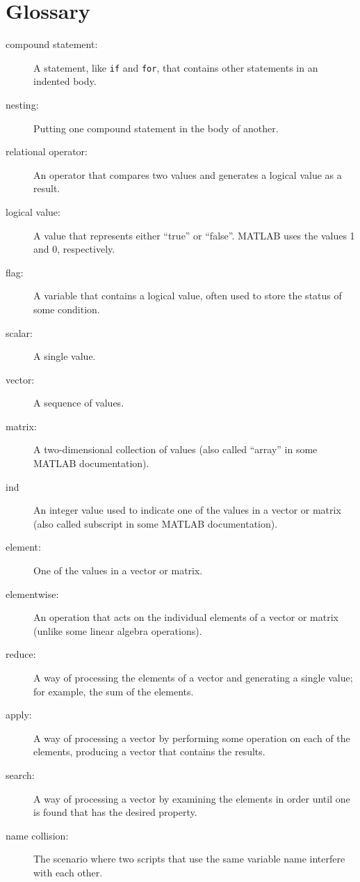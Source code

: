 \section{Glossary}

\begin{description}

\item[compound statement:] A statement, like {\tt if} and {\tt for}, that
contains other statements in an indented body.

\item[nesting:] Putting one compound statement in the body of another.

\item[relational operator:] An operator that compares two values and
generates a logical value as a result.

\item[logical value:] A value that represents either ``true'' or
``false''.  MATLAB uses the values 1 and 0, respectively.

\item[flag:] A variable that contains a logical value, often used
to store the status of some condition.

\item[scalar:] A single value.

\item[vector:] A sequence of values.

\item[matrix:] A two-dimensional collection of values (also called
``array'' in some MATLAB documentation).

\item[ind] An integer value used to indicate one of the values
in a vector or matrix (also called subscript in some MATLAB documentation).

\item[element:] One of the values in a vector or matrix.

\item[elementwise:] An operation that acts on the individual elements
of a vector or matrix (unlike some linear algebra operations).

\item[reduce:] A way of processing the elements of a vector and
generating a single value; for example, the sum of the elements.

\item[apply:] A way of processing a vector by performing some operation
on each of the elements, producing a vector that contains the
results.

\item[search:] A way of processing a vector by examining the
elements in order until one is found that has the desired property.

\item[name collision:] The scenario where two scripts that use the
same variable name interfere with each other.

\end{description}

